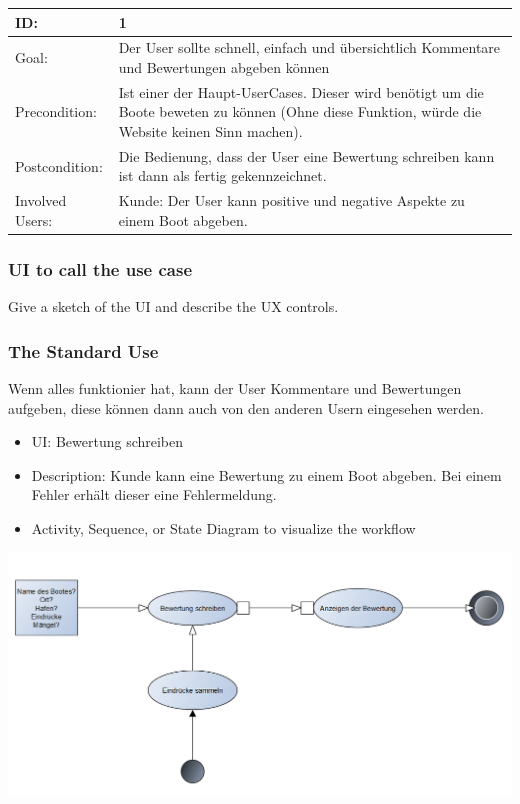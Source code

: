 \documentclass[12pt]{article}
\theoremstyle{definition}
\begin{document}
\begin{tabular}{|p{.2\linewidth}|p{.65\linewidth}|}
\hline 
ID: & 1 \\ \hline
Goal: & Der User sollte schnell, einfach und übersichtlich Kommentare und Bewertungen abgeben können \\ \hline
Precondition: & Ist einer der Haupt-UserCases. Dieser wird benötigt um die Boote beweten zu können (Ohne diese Funktion, würde die Website keinen Sinn machen). \\ \hline
Postcondition: & Die Bedienung, dass der User eine Bewertung schreiben kann ist dann als fertig gekennzeichnet. \\ \hline
Involved Users: &Kunde: Der User kann positive und negative Aspekte zu einem Boot abgeben. \\ \hline
\end{tabular}

\subsubsection{UI to call the use case}
Give a sketch of the UI and describe the UX controls.

\subsubsection{The Standard Use}
Wenn alles funktionier hat, kann der User Kommentare und Bewertungen aufgeben, diese können dann auch von den anderen Usern eingesehen werden.
\begin{itemize}
	\item UI: Bewertung schreiben
	\item Description: Kunde kann eine Bewertung zu einem Boot abgeben. Bei einem Fehler erhält dieser eine Fehlermeldung.
	\item Activity, Sequence, or State Diagram to visualize the workflow
\end{itemize}
\includegraphics[height=0.40\textwidth]{Bewertung_schreiben.PNG}
\end{document}

